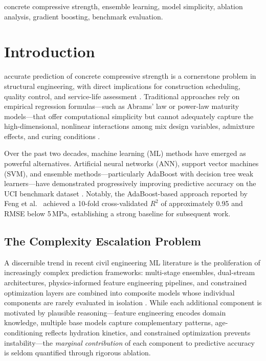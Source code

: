 \documentclass[journal]{IEEEtran}
\begin{document}
\begin{abstract}
marginal gain across independent validation data.
\end{abstract}

\begin{IEEEkeywords}
concrete compressive strength, ensemble learning, model simplicity, ablation analysis, gradient boosting, benchmark evaluation.
\end{IEEEkeywords}

\IEEEpeerreviewmaketitle

\section{Introduction}

 accurate prediction of concrete compressive strength is a cornerstone problem in structural engineering, with direct implications for construction scheduling, quality control, and service-life assessment \cite{yeh1998concrete}. Traditional approaches rely on empirical regression formulas---such as Abrams' law or power-law maturity models---that offer computational simplicity but cannot adequately capture the high-dimensional, nonlinear interactions among mix design variables, admixture effects, and curing conditions \cite{yeh2006analysis}.

Over the past two decades, machine learning (ML) methods have emerged as powerful alternatives. Artificial neural networks (ANN), support vector machines (SVM), and ensemble methods---particularly AdaBoost with decision tree weak learners---have demonstrated progressively improving predictive accuracy on the UCI benchmark dataset \cite{yeh1998concrete,chou2014machine}. Notably, the AdaBoost-based approach reported by Feng et al.\ \cite{feng2020machine} achieved a 10-fold cross-validated $R^2$ of approximately 0.95 and RMSE below 5\,MPa, establishing a strong baseline for subsequent work.

\subsection{The Complexity Escalation Problem}

A discernible trend in recent civil engineering ML literature is the proliferation of increasingly complex prediction frameworks: multi-stage ensembles, dual-stream architectures, physics-informed feature engineering pipelines, and constrained optimization layers are combined into composite models whose individual components are rarely evaluated in isolation \cite{chou2014machine,erdal2013prediction}. While each additional component is motivated by plausible reasoning---feature engineering encodes domain knowledge, multiple base models capture complementary patterns, age-conditioning reflects hydration kinetics, and constrained optimization prevents instability---the \emph{marginal contribution} of each component to predictive accuracy is seldom quantified through rigorous ablation.
\end{document}
